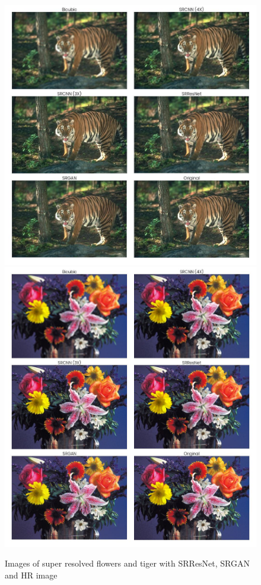     \begin{figure}
        \centering
        \includegraphics[width=5.5in]{./figures/examples/tiger.jpg}
        \includegraphics[width=5.5in]{./figures/examples/flowers.jpg}
        \caption{Images of super resolved flowers and tiger with SRResNet, SRGAN and HR image}
    \end{figure}      
  
